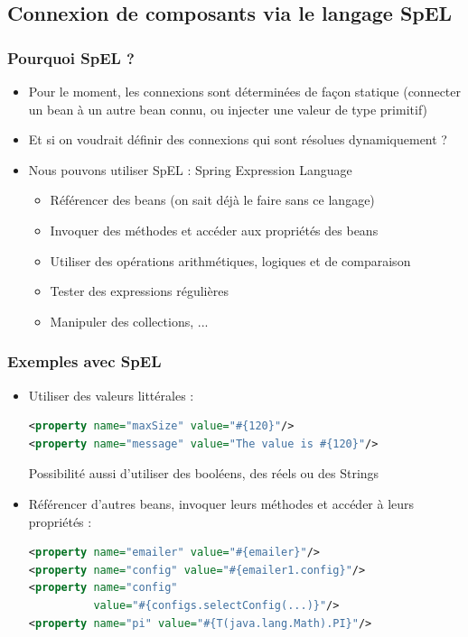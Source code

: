 \documentclass{beamer}
\begin{document}
\subsection{Connexion de composants via le langage SpEL}
\begin{frame}
  \frametitle{Pourquoi SpEL ?}
  \begin{itemize}
  \item Pour le moment, les connexions sont déterminées de façon
    statique (connecter un bean à un autre bean connu, ou injecter une
    valeur de type primitif)
  \item Et si on voudrait définir des connexions qui sont résolues
    dynamiquement ?
  \item Nous pouvons utiliser SpEL : Spring Expression Language
    \begin{itemize}
    \item Référencer des beans (on sait déjà le faire sans ce langage)
    \item Invoquer des méthodes et accéder aux propriétés des beans
    \item Utiliser des opérations arithmétiques, logiques et de
      comparaison
    \item Tester des expressions régulières
    \item Manipuler des collections, ...
    \end{itemize}
  \end{itemize}
\end{frame}

\begin{frame}[fragile]
  \frametitle{Exemples avec SpEL}
  \begin{itemize}
  \item Utiliser des valeurs littérales :
\begin{lstlisting}[language=XML,basicstyle=\scriptsize]    
<property name="maxSize" value="#{120}"/>
<property name="message" value="The value is #{120}"/>
\end{lstlisting}
Possibilité aussi d'utiliser des booléens, des réels ou des Strings
\item Référencer d'autres beans, invoquer leurs méthodes et accéder
  à leurs propriétés :
\begin{lstlisting}[language=XML,basicstyle=\scriptsize]  
<property name="emailer" value="#{emailer}"/>
<property name="config" value="#{emailer1.config}"/>
<property name="config"
          value="#{configs.selectConfig(...)}"/>
<property name="pi" value="#{T(java.lang.Math).PI}"/>
\end{lstlisting}
  \end{itemize}
\end{frame}
\end{document}
